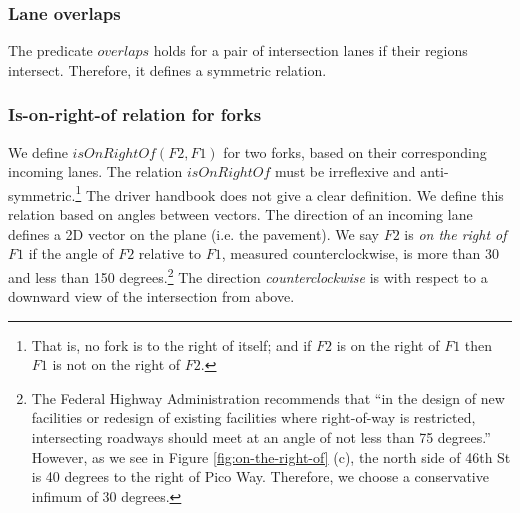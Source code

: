 \subsubsection{Lane overlaps}
The predicate $overlaps$ holds for a pair of intersection lanes if
their regions intersect.
Therefore, it defines a symmetric relation.
\subsubsection{Is-on-right-of relation for forks}
We define $isOnRightOf(F2, F1)$ for two forks,
based on their corresponding incoming lanes.
The relation $isOnRightOf$ must be irreflexive and anti-symmetric.\footnote{That is,
no fork is to the right of itself;
and if $F2$ is on the right of $F1$ then
$F1$ is not on the right of $F2$.}
The driver handbook does not give a clear definition.
We define this relation based on angles between vectors.
The direction of an incoming lane
defines a 2D vector on the plane (i.e. the pavement).
We say $F2$ is \emph{on the right of} $F1$ if the angle of $F2$ relative to $F1$,
measured counterclockwise,
is more than 30 and less than 150 degrees.\footnote{The Federal Highway Administration recommends that
``in the design of new facilities or redesign of existing facilities where right-of-way is restricted,
intersecting roadways should meet at an angle of not less than 75 degrees.''\cite{FHWA.2001}
However,
as we see in Figure \ref{fig:on-the-right-of} (c),
the north side of 46th St is 40 degrees to the right of Pico Way.
Therefore,
we choose a conservative infimum of 30 degrees.}
The direction \emph{counterclockwise} is with respect to a downward view of the intersection from above.

